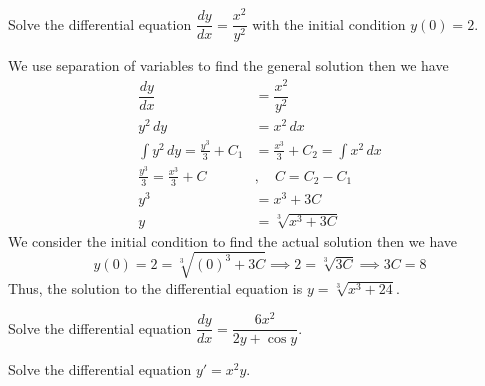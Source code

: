 \begin{problem}
    Solve the differential equation \(\dfrac{dy}{dx}=\dfrac{x^2}{y^2}\) with
    the initial condition \(y(0)=2\).
\end{problem}
\begin{solution}
    We use separation of variables to find the general solution then we have
    \begin{align*}
        \dfrac{dy}{dx}&=\dfrac{x^2}{y^2}\\y^2\,dy&=x^2\,dx\\\int y^2\,dy
        =\frac{y^3}{3}+C_1&=\frac{x^3}{3}+C_2=\int x^2\,dx\\\frac{y^3}{3}
        =\frac{x^3}{3}+C&,\quad C=C_2-C_1\\y^3&=x^3+3C\\y&=\sqrt[3]{x^3+3C}
    \end{align*}
    We consider the initial condition to find the actual solution then we have
    \[y(0)=2=\sqrt[3]{(0)^3+3C}\implies 2=\sqrt[3]{3C}\implies 3C=8\]
    Thus, the solution to the differential equation is \(y=\sqrt[3]{x^3+24}\).
\end{solution}
\begin{problem}
    Solve the differential equation \(\dfrac{dy}{dx}=\dfrac{6x^2}{2y+\cos y}\).
\end{problem}
\begin{problem}
    Solve the differential equation \(y'=x^2y\).
\end{problem}
